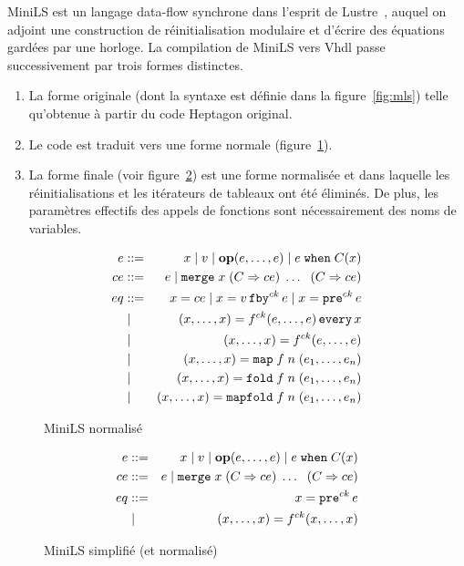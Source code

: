 \documentclass[a4paper]{article}
\newcommand{\LANG}{{\sc Heptagon}}
\newcommand{\lustre}{{\sc Lustre}}
\newcommand{\minils}{{\sc MiniLS}}
\newcommand{\vhdl}{{\sc Vhdl}}
\newcommand{\p}[0]{\; \vert \;}
\newcommand{\mybox}[1]{\mbox{\tt{#1}}}
\newcommand{\Coloneqq}[0]{::=}
\newcommand{\Op}[2]{\mybox{\bf{op}}(#1,\dots,#2)}
\newcommand{\Fby}[2]{#1 \, \mybox{fby}^{ck} \, #2}
\newcommand{\Pre}[1]{\mybox{pre}^{ck} \, #1}
\newcommand{\Every}[4]{#1^{ck}(#2,\dots,#3) \, \mybox{every} \, #4}
\newcommand{\App}[2]{#1^{ck}(#2)}
\newcommand{\When}[3]{#1 \; \mybox{when} \; #2(#3)}
\newcommand{\Merge}[5]{\mybox{merge} \; #1 \; (#2 \Rightarrow #3) \; \dots \; \
  (#4 \Rightarrow #5)}
\newcommand{\Map}[3]{\mathtt{map} \; #1\; n\; (#2,\dots,#3)}
\newcommand{\Fold}[3]{\mathtt{fold} \; #1\; n\; (#2,\dots,#3)}
\newcommand{\Mapfold}[3]{\mathtt{mapfold} \; #1\; n\; (#2,\dots,#3)}
\begin{document}
\minils{} est un langage data-flow synchrone dans l'esprit de
\lustre~\cite{lustre:ieee91}, auquel on adjoint une construction de
r\'einitialisation modulaire et d'\'ecrire des \'equations gard\'ees par une
horloge. La compilation de \minils{} vers \vhdl{} passe successivement
par trois formes distinctes.

\begin{enumerate}
\item La forme originale (dont la syntaxe est d\'efinie dans la figure~\ref{fig:mls}) telle
  qu'obtenue \`a partir du code \LANG{} original.
\item Le code est traduit vers une forme normale
  (figure~\ref{fig:mlsn}).
\item La forme finale (voir figure~\ref{fig:mlsns}) est une forme
normalis\'ee et dans laquelle les r\'einitialisations et les it\'erateurs de tableaux
ont \'et\'e \'elimin\'es. De plus, les param\`etres effectifs des appels de fonctions
sont n\'ecessairement des noms de variables.
\end{enumerate}

\begin{figure}[htp]
  \centering
  \begin{eqnarray*}
    e & \Coloneqq & x \p v \p \Op{e}{e} \p \When{e}{C}{x} \\
    ce & \Coloneqq & e \p \Merge{x}{C}{ce}{C}{ce} \\
    eq & \Coloneqq & x = ce \p x = \Fby{v}{e} \p x = \Pre{e} \\
    & \p & (x,\dots,x) = \Every{f}{e}{e}{x} \\
    & \p & (x,\dots,x) = \App{f}{e,\dots,e} \\
    & \p & (x,\dots,x) = \Map{f}{e_1}{e_n} \\
    & \p & (x,\dots,x) = \Fold{f}{e_1}{e_n} \\
    & \p & (x,\dots,x) = \Mapfold{f}{e_1}{e_n}
  \end{eqnarray*}
  \caption{MiniLS normalis\'e}
  \label{fig:mlsn}
\end{figure}

\begin{figure}[htp]
  \centering
  \begin{eqnarray*}
    e & \Coloneqq & x \p v \p \Op{e}{e} \p \When{e}{C}{x} \\
    ce & \Coloneqq & e \p \Merge{x}{C}{ce}{C}{ce} \\
    eq & \Coloneqq & x = \Pre{e} \\
    & \p & (x,\dots,x) = \App{f}{x,\dots,x}
  \end{eqnarray*}
  \caption{MiniLS simplifi\'e (et normalis\'e)}
  \label{fig:mlsns}
\end{figure}
\end{document}
